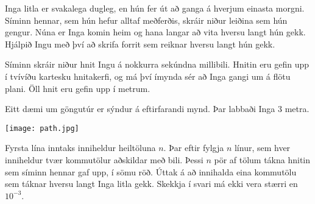 

Inga litla er svakalega dugleg, en hún fer út að ganga á hverjum einasta
morgni. Síminn hennar, sem hún hefur alltaf meðferðis, skráir niður leiðina sem
hún gengur. Núna er Inga komin heim og hana langar að vita hversu langt hún
gekk. Hjálpið Ingu með því að skrifa forrit sem reiknar hversu langt hún gekk.

Síminn skráir niður hnit Ingu á nokkurra sekúndna millibili. Hnitin eru gefin
upp í tvívíðu kartesku hnitakerfi, og má því ímynda sér að Inga gangi um
á flötu plani. Öll hnit eru gefin upp í metrum.

Eitt dæmi um göngutúr er sýndur á eftirfarandi mynd. Þar labbaði Inga $3$
metra.

\texttt{[image: path.jpg]}

Fyrsta lína inntaks inniheldur heiltöluna $n$. Þar eftir fylgja $n$ línur, sem
hver inniheldur tvær kommutölur aðskildar með bili. Þessi $n$ pör af tölum
tákna hnitin sem síminn hennar gaf upp, í sömu röð. Úttak á að innihalda eina
kommutölu sem táknar hversu langt Inga litla gekk. Skekkja í svari má ekki vera
stærri en $10^{-3}$.

